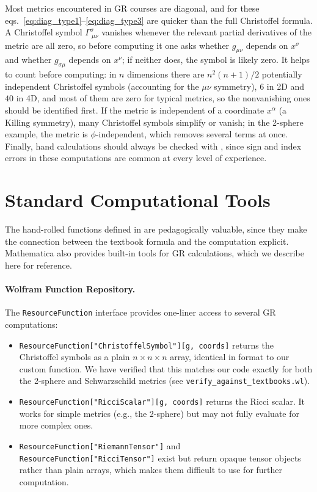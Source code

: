 Most metrics encountered in GR courses are diagonal, and for these
eqs.~\eqref{eq:diag_type1}--\eqref{eq:diag_type3} are quicker than
the full Christoffel formula.  A Christoffel symbol $\Gamma^\sigma_{\ \mu\nu}$
vanishes whenever the relevant partial derivatives of the metric are all
zero, so before computing it one asks whether $g_{\mu\nu}$ depends on
$x^\sigma$ and whether $g_{\sigma\mu}$ depends on $x^\nu$; if neither does,
the symbol is likely zero.  It helps to count before computing:
in $n$ dimensions there are $n^2(n+1)/2$ potentially independent
Christoffel symbols (accounting for the $\mu\nu$ symmetry),
$6$ in 2D and $40$ in 4D, and most of them are zero for
typical metrics, so the nonvanishing ones should be identified first.
If the metric is independent of a coordinate $x^\alpha$
(a Killing symmetry), many Christoffel symbols simplify or vanish;
in the 2-sphere example, the metric is $\phi$-independent,
which removes several terms at once.
Finally, hand calculations should always be checked with
,
since sign and index errors in these computations are common at every
level of experience.


\section{Standard Computational Tools}
\label{sec:dg_standard_tools}

The hand-rolled functions defined in
are pedagogically valuable, since they make the connection between the
textbook formula and the computation explicit.  Mathematica
also provides built-in tools for GR calculations, which we describe
here for reference.

\paragraph{Wolfram Function Repository.}
The \texttt{ResourceFunction} interface provides one-liner access to
several GR computations:
\begin{itemize}[nosep]
    \item \texttt{ResourceFunction["ChristoffelSymbol"][g, coords]}
          returns the Christoffel symbols as a plain $n \times n \times n$
          array, identical in format to our custom function.  We have
          verified that this matches our code exactly for both the 2-sphere
          and Schwarzschild metrics (see
          \texttt{verify\_against\_textbooks.wl}).
    \item \texttt{ResourceFunction["RicciScalar"][g, coords]}
          returns the Ricci scalar.  It works for simple metrics (e.g.,
          the 2-sphere) but may not fully evaluate for more complex ones.
    \item \texttt{ResourceFunction["RiemannTensor"]} and
          \texttt{ResourceFunction["RicciTensor"]} exist but
          return opaque tensor objects rather than plain arrays, which
          makes them difficult to use for further computation.
\end{itemize}


